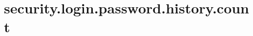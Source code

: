 \section{security.login.password.history.count}
\label{configuration:SecurityLoginPasswordHistoryCount}
\TODO
